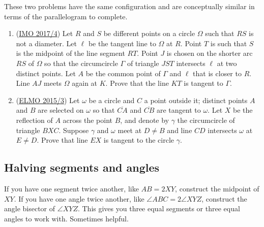 \documentclass[11pt,paper=letter]{scrartcl}
\begin{document}
These two problems have the same configuration and are conceptually similar in terms of the parallelogram to complete.

\begin{enumerate}
  \item (\href{https://aops.com/community/c6h1480682}{IMO 2017/4}) Let $R$ and $S$ be different points on a circle $\Omega$ such that $RS$ is not a diameter. Let $\ell$ be the tangent line to $\Omega$ at $R$. Point $T$ is such that $S$ is the midpoint of the line segment $RT$. Point $J$ is chosen on the shorter arc $RS$ of $\Omega$ so that the circumcircle $\Gamma$ of triangle $JST$ intersects $\ell$ at two distinct points. Let $A$ be the common point of $\Gamma$ and $\ell$ that is closer to $R$. Line $AJ$ meets $\Omega$ again at $K$. Prove that the line $KT$ is tangent to $\Gamma$. 

  \item (\href{https://aops.com/community/c6h1107238}{ELMO 2015/3}) Let $\omega$ be a circle and $C$ a point outside it; distinct points $A$ and $B$ are selected on $\omega$ so that $\overline{CA}$ and $\overline{CB}$ are tangent to $\omega$. Let $X$ be the reflection of $A$ across the point $B$, and denote by $\gamma$ the circumcircle of triangle $BXC$. Suppose $\gamma$ and $\omega$ meet at $D \neq B$ and line $CD$ intersects $\omega$ at $E \neq D$. Prove that line $EX$ is tangent to the circle $\gamma$.
\end{enumerate}

\subsection{Halving segments and angles}

If you have one segment twice another, like $AB = 2XY$, construct the midpoint of $XY$. If you have one angle twice another, like $\angle ABC = 2\angle XYZ$, construct the angle bisector of $\angle XYZ$. This gives you three equal segments or three equal angles to work with. Sometimes helpful.
\end{document}
